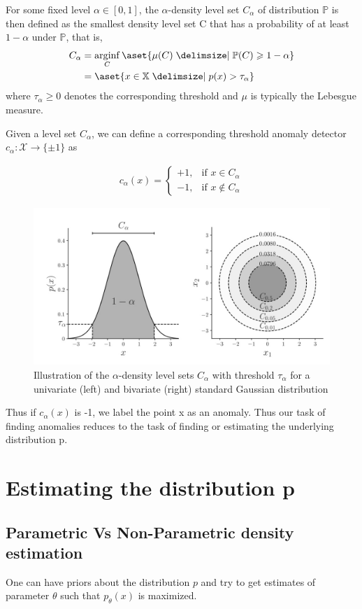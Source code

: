 \documentclass[11pt]{report}
\begin{document}
For some fixed level $\alpha \in [0, 1]$, the $\alpha$-density level set $C_\alpha$ of
distribution $\mathbb{P}$ is then defined as the smallest density level
set C that has a probability of at least $1 - \alpha$ under $\mathbb{P}$, that is,
\begin{align}
    C_\alpha &= \mathop{\arg\!\inf}_{C} \aset{\mu(C) \suchthat \mathbb{P}(C) \geq 1 - \alpha} \nonumber\\
     &= \aset{x \in \mathbb{X} \suchthat p(x) > \tau_\alpha}
\end{align}
where $\tau_\alpha \geq 0$ denotes the corresponding threshold and
$\mu$ is typically the Lebesgue measure.

Given a level set \( C_\alpha \), we can define a corresponding
threshold anomaly detector \( c_\alpha : \mathcal{X} \rightarrow \{ \pm 1 \} \) as

\begin{align}
    c_\alpha(x) =
    \begin{cases}
    +1, & \text{if } x \in C_\alpha \\
    -1, & \text{if } x \notin C_\alpha
    \end{cases}
\end{align}
\begin{figure}
    \centering
    \includegraphics[width=0.5\linewidth]{images/levelset.jpeg}
    \caption{Illustration of the $\alpha$-density level sets $C_\alpha$ with threshold
$\tau_\alpha$ for a univariate (left) and bivariate (right) standard Gaussian
distribution \cite{ruff2020unifying}}
    \label{fig:placeholder}
\end{figure}

Thus if $c_\alpha(x)$ is -1, we label the point x as an anomaly. Thus our task of finding anomalies reduces to the task of finding or estimating the underlying distribution p.

\section{Estimating the distribution p}
\subsection{Parametric Vs Non-Parametric density estimation} One can have priors about the distribution $p$ and try to get estimates of parameter $\theta$ such that $p_\theta(x)$ is maximized.
\end{document}
